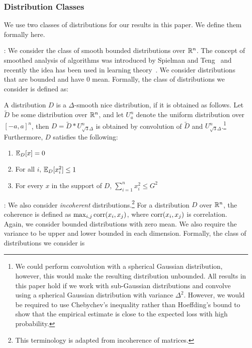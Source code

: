 \subsubsection*{Distribution Classes}

We use two classes of distributions for our results in this paper. We define
them formally here. \medskip 

: We consider the class of smooth
bounded distributions over $\mathbb{R}^n$. The concept of smoothed analysis of
algorithms was introduced by Spielman and Teng~\cite{ST:2004} and recently the
idea has been used in learning theory~\cite{KST:2009,KKM:2013}. We consider
distributions that are bounded and have $0$ mean. Formally, the class of
distributions we consider is defined as:

\begin{definition}
\label{defn:afghanistan} A distribution $D$ is a $\Delta$-smooth nice
distribution, if it is obtained as follows. Let $\tilde{D}$ be some distribution
over $\mathbb{R}^n$, and let $U^n_a$ denote the uniform distribution over $[-a,
a]^n$, then $D = \tilde{D} * U^n_{\sqrt{3}\Delta}$ is obtained by convolution of
$\tilde{D}$ and $U^n_{\sqrt{3} \Delta}$.\footnote{We could perform convolution
with a spherical Gaussian distribution, however, this would make the resulting
distribution unbounded. All results in this paper hold if we work with
sub-Gaussian distributions and convolve using a spherical Gaussian distribution
with variance $\Delta^2$.  However, we would be required to use Chebychev's
inequality rather than Hoeffding's bound to show that the empirical estimate is
close to the expected loss with high probability.} Furthermore, $D$ satisfies
the following:
\begin{enumerate}
\item $\mathbb{E}_D[x] = 0$
\item For all $i$, $\mathbb{E}_D[x_i^2] \leq 1$
\item For every $x$ in the support of $D$, $\sum_{i = 1}^n x_i^2 \leq G^2$
\end{enumerate}
\end{definition}

: We also consider \emph{incoherent}
distributions.\footnote{This terminology is adapted from incoherence of
matrices.} For a distribution $D$ over $\mathbb{R}^n$, the coherence is defined as
$\max_{i, j} \mathrm{corr}(x_i, x_j)$, where $\mathrm{corr}(x_i, x_j)$ is correlation. Again, we
consider bounded distributions with zero mean. We also require the variance to
be upper and lower bounded in each dimension. Formally, the class of
distributions we consider is

